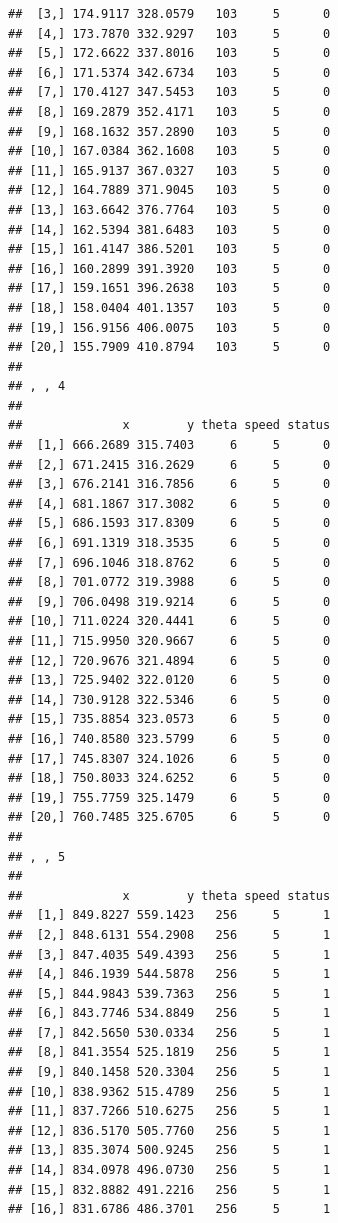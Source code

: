\documentclass{article}\usepackage[]{graphicx}\usepackage[]{color}
\makeatletter
\newenvironment{kframe}{%
 \def\at@end@of@kframe{}%
 \ifinner\ifhmode%
  \def\at@end@of@kframe{\end{minipage}}%
  \begin{minipage}{\columnwidth}%
 \fi\fi%
 \def\FrameCommand##1{\hskip\@totalleftmargin \hskip-\fboxsep
 \colorbox{shadecolor}{##1}\hskip-\fboxsep
     \hskip-\linewidth \hskip-\@totalleftmargin \hskip\columnwidth}%
 \MakeFramed {\advance\hsize-\width
   \@totalleftmargin\z@ \linewidth\hsize
   \@setminipage}}%
 {\par\unskip\endMakeFramed%
 \at@end@of@kframe}
\newenvironment{knitrout}{}{} %
\makeatother
\begin{document}
\begin{knitrout}
\begin{kframe}
\begin{verbatim}
##  [3,] 174.9117 328.0579   103     5      0
##  [4,] 173.7870 332.9297   103     5      0
##  [5,] 172.6622 337.8016   103     5      0
##  [6,] 171.5374 342.6734   103     5      0
##  [7,] 170.4127 347.5453   103     5      0
##  [8,] 169.2879 352.4171   103     5      0
##  [9,] 168.1632 357.2890   103     5      0
## [10,] 167.0384 362.1608   103     5      0
## [11,] 165.9137 367.0327   103     5      0
## [12,] 164.7889 371.9045   103     5      0
## [13,] 163.6642 376.7764   103     5      0
## [14,] 162.5394 381.6483   103     5      0
## [15,] 161.4147 386.5201   103     5      0
## [16,] 160.2899 391.3920   103     5      0
## [17,] 159.1651 396.2638   103     5      0
## [18,] 158.0404 401.1357   103     5      0
## [19,] 156.9156 406.0075   103     5      0
## [20,] 155.7909 410.8794   103     5      0
## 
## , , 4
## 
##              x        y theta speed status
##  [1,] 666.2689 315.7403     6     5      0
##  [2,] 671.2415 316.2629     6     5      0
##  [3,] 676.2141 316.7856     6     5      0
##  [4,] 681.1867 317.3082     6     5      0
##  [5,] 686.1593 317.8309     6     5      0
##  [6,] 691.1319 318.3535     6     5      0
##  [7,] 696.1046 318.8762     6     5      0
##  [8,] 701.0772 319.3988     6     5      0
##  [9,] 706.0498 319.9214     6     5      0
## [10,] 711.0224 320.4441     6     5      0
## [11,] 715.9950 320.9667     6     5      0
## [12,] 720.9676 321.4894     6     5      0
## [13,] 725.9402 322.0120     6     5      0
## [14,] 730.9128 322.5346     6     5      0
## [15,] 735.8854 323.0573     6     5      0
## [16,] 740.8580 323.5799     6     5      0
## [17,] 745.8307 324.1026     6     5      0
## [18,] 750.8033 324.6252     6     5      0
## [19,] 755.7759 325.1479     6     5      0
## [20,] 760.7485 325.6705     6     5      0
## 
## , , 5
## 
##              x        y theta speed status
##  [1,] 849.8227 559.1423   256     5      1
##  [2,] 848.6131 554.2908   256     5      1
##  [3,] 847.4035 549.4393   256     5      1
##  [4,] 846.1939 544.5878   256     5      1
##  [5,] 844.9843 539.7363   256     5      1
##  [6,] 843.7746 534.8849   256     5      1
##  [7,] 842.5650 530.0334   256     5      1
##  [8,] 841.3554 525.1819   256     5      1
##  [9,] 840.1458 520.3304   256     5      1
## [10,] 838.9362 515.4789   256     5      1
## [11,] 837.7266 510.6275   256     5      1
## [12,] 836.5170 505.7760   256     5      1
## [13,] 835.3074 500.9245   256     5      1
## [14,] 834.0978 496.0730   256     5      1
## [15,] 832.8882 491.2216   256     5      1
## [16,] 831.6786 486.3701   256     5      1

\end{verbatim}
\end{kframe}
\end{knitrout}
\end{document}
